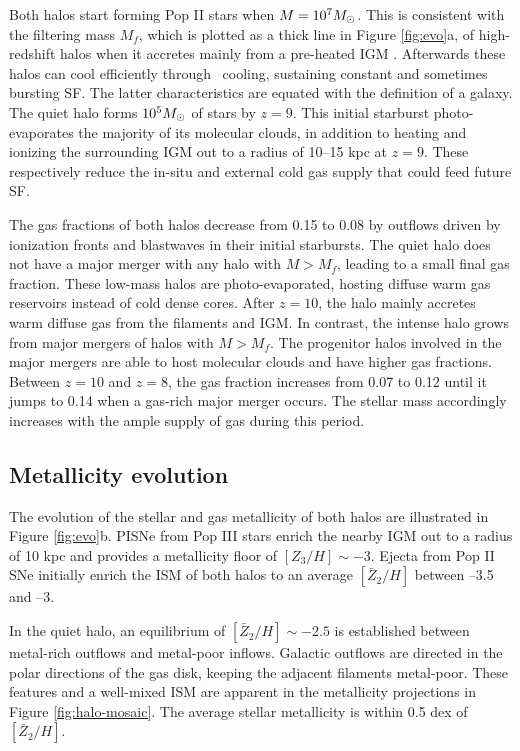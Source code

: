 \documentclass[apjl]{emulateapj}
\begin{document}
Both halos start forming Pop II stars when $M = 10^7 \Ms$.  This is
consistent with the filtering mass $M_f$, which is plotted as a thick
line in Figure \ref{fig:evo}a, of high-redshift halos when it accretes
mainly from a pre-heated IGM \citep{gnedin98, gnedin00, Wise08_Gal}.
Afterwards these halos can cool efficiently through \hh~cooling,
sustaining constant and sometimes bursting SF.  The latter
characteristics are equated with the definition of a galaxy.  The
quiet halo forms $10^5 \Ms$ of stars by $z=9$.  This initial starburst
photo-evaporates the majority of its molecular clouds, in addition to
heating and ionizing the surrounding IGM out to a radius of 10--15 kpc
at $z=9$.  These respectively reduce the in-situ and external cold gas
supply that could feed future SF.

The gas fractions of both halos decrease from 0.15 to 0.08 by outflows
driven by ionization fronts and blastwaves in their initial
starbursts.  The quiet halo does not have a major merger with any halo
with $M > M_f$, leading to a small final gas fraction.  These low-mass
halos are photo-evaporated, hosting diffuse warm gas reservoirs
instead of cold dense cores.  After $z=10$, the halo mainly accretes
warm diffuse gas from the filaments and IGM.  In contrast, the intense
halo grows from major mergers of halos with $M > M_f$.  The progenitor
halos involved in the major mergers are able to host molecular clouds
and have higher gas fractions.  Between $z=10$ and $z=8$, the gas
fraction increases from 0.07 to 0.12 until it jumps to 0.14 when a
gas-rich major merger occurs.  The stellar mass accordingly increases
with the ample supply of gas during this period.  

\subsection{Metallicity evolution}

The evolution of the stellar and gas metallicity of both halos are
illustrated in Figure \ref{fig:evo}b.  PISNe from Pop III stars enrich
the nearby IGM out to a radius of 10 kpc and provides a metallicity
floor of $[Z_3/H] \sim -3$.  Ejecta from Pop II SNe initially enrich
the ISM of both halos to an average $[\bar{Z}_2/H]$ between --3.5 and
--3.

In the quiet halo, an equilibrium of $[\bar{Z}_2/H] \sim -2.5$ is
established between metal-rich outflows and metal-poor inflows.
Galactic outflows are directed in the polar directions of the gas
disk, keeping the adjacent filaments metal-poor.  These features and a
well-mixed ISM \citep[cf.][]{Wise08_Gal, Greif10} are apparent in the
metallicity projections in Figure \ref{fig:halo-mosaic}.  The average
stellar metallicity is within 0.5 dex of $[\bar{Z}_2/H]$.
\end{document}
